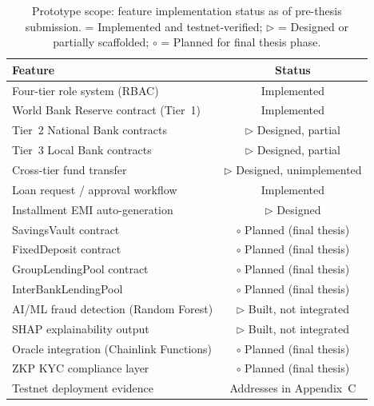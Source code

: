 \documentclass[acmsmall,screen,review]{acmart}
\newcommand{\tmarkDone}{\checkmark}
\newcommand{\tmarkPartial}{$\triangleright$}
\newcommand{\tmarkPlanned}{$\circ$}
\newcommand{\tableheadcolor}{\rowcolor{PrimaryBlue!12}}
\begin{document}
\begin{table}[H]
\centering
\setlength{\tabcolsep}{5pt}
\caption{Prototype scope: feature implementation status as of pre-thesis submission. \tmarkDone{} = Implemented and testnet-verified; \tmarkPartial{} = Designed or partially scaffolded; \tmarkPlanned{} = Planned for final thesis phase.}
\label{tab:prototype-scope}
\renewcommand{\arraystretch}{1.3}
\small
\begin{tabular}{@{}p{7.5cm}c@{}}
\toprule
\tableheadcolor
\tableheadfont Feature & \tableheadfont Status \\
\midrule
Four-tier role system (RBAC) & \tmarkDone{} Implemented \\
\rowcolor{RowShade}
World Bank Reserve contract (Tier~1) & \tmarkDone{} Implemented \\
Tier~2 National Bank contracts & \tmarkPartial{} Designed, partial \\
\rowcolor{RowShade}
Tier~3 Local Bank contracts & \tmarkPartial{} Designed, partial \\
Cross-tier fund transfer & \tmarkPartial{} Designed, unimplemented \\
\rowcolor{RowShade}
Loan request / approval workflow & \tmarkDone{} Implemented \\
Installment EMI auto-generation & \tmarkPartial{} Designed \\
\rowcolor{RowShade}
SavingsVault contract & \tmarkPlanned{} Planned (final thesis) \\
FixedDeposit contract & \tmarkPlanned{} Planned (final thesis) \\
\rowcolor{RowShade}
GroupLendingPool contract & \tmarkPlanned{} Planned (final thesis) \\
InterBankLendingPool & \tmarkPlanned{} Planned (final thesis) \\
\rowcolor{RowShade}
AI/ML fraud detection (Random Forest) & \tmarkPartial{} Built, not integrated \\
SHAP explainability output & \tmarkPartial{} Built, not integrated \\
\rowcolor{RowShade}
Oracle integration (Chainlink Functions) & \tmarkPlanned{} Planned (final thesis) \\
ZKP KYC compliance layer & \tmarkPlanned{} Planned (final thesis) \\
\rowcolor{RowShade}
Testnet deployment evidence & \tmarkDone{} Addresses in Appendix~C \\
\bottomrule
\end{tabular}
\end{table}
\end{document}
